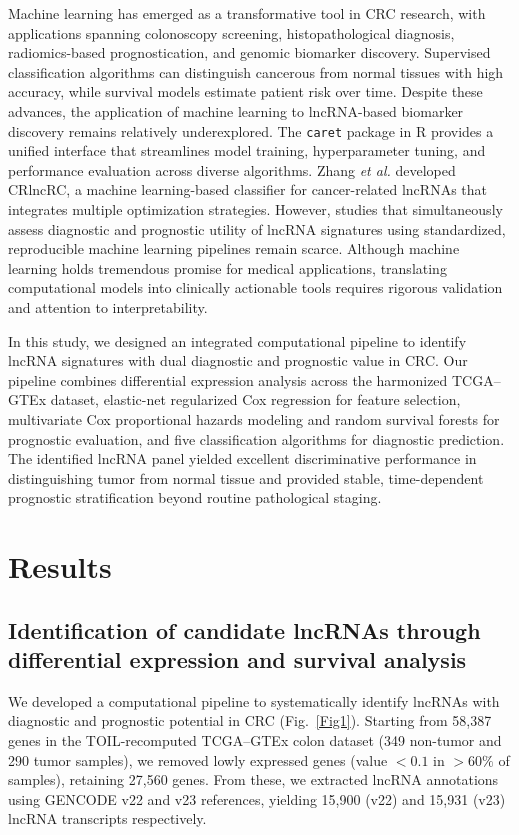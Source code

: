 \documentclass[fleqn,10pt]{wlscirep}
\begin{document}
Machine learning has emerged as a transformative tool in CRC research, with applications spanning colonoscopy screening, histopathological diagnosis, radiomics-based prognostication, and genomic biomarker discovery\cite{RN13}. Supervised classification algorithms can distinguish cancerous from normal tissues with high accuracy, while survival models estimate patient risk over time\cite{RN14,RN15}. Despite these advances, the application of machine learning to lncRNA-based biomarker discovery remains relatively underexplored. The \texttt{caret} package in R provides a unified interface that streamlines model training, hyperparameter tuning, and performance evaluation across diverse algorithms\cite{RN16}. Zhang \textit{et al.} developed CRlncRC, a machine learning-based classifier for cancer-related lncRNAs that integrates multiple optimization strategies\cite{RN17}. However, studies that simultaneously assess diagnostic and prognostic utility of lncRNA signatures using standardized, reproducible machine learning pipelines remain scarce\cite{RN18}. Although machine learning holds tremendous promise for medical applications, translating computational models into clinically actionable tools requires rigorous validation and attention to interpretability\cite{RN19}.

In this study, we designed an integrated computational pipeline to identify lncRNA signatures with dual diagnostic and prognostic value in CRC. Our pipeline combines differential expression analysis across the harmonized TCGA--GTEx dataset, elastic-net regularized Cox regression for feature selection, multivariate Cox proportional hazards modeling and random survival forests for prognostic evaluation, and five classification algorithms for diagnostic prediction. The identified lncRNA panel yielded excellent discriminative performance in distinguishing tumor from normal tissue and provided stable, time-dependent prognostic stratification beyond routine pathological staging.

\section*{Results}

\subsection*{Identification of candidate lncRNAs through differential expression and survival analysis}

We developed a computational pipeline to systematically identify lncRNAs with diagnostic and prognostic potential in CRC (Fig.~\ref{Fig1}). Starting from 58,387 genes in the TOIL-recomputed TCGA--GTEx colon dataset (349 non-tumor and 290 tumor samples), we removed lowly expressed genes (value $< 0.1$ in $> 60\%$ of samples), retaining 27,560 genes. From these, we extracted lncRNA annotations using GENCODE v22 and v23 references, yielding 15,900 (v22) and 15,931 (v23) lncRNA transcripts respectively.
\end{document}
